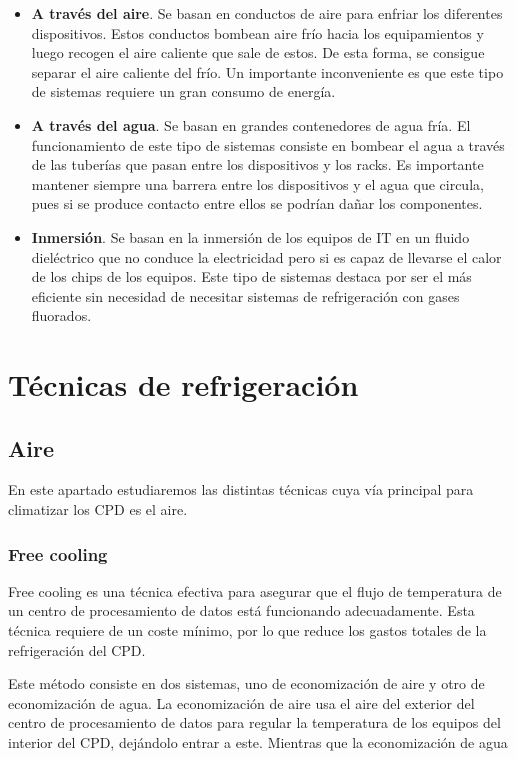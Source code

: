 \begin{itemize}
    \item \textbf{A través del aire}. Se basan en conductos de aire para enfriar los diferentes dispositivos. Estos conductos bombean aire frío hacia los equipamientos y luego recogen el aire caliente que sale de estos. De esta forma, se consigue separar el aire caliente del frío. Un importante inconveniente es que este tipo de sistemas requiere un gran consumo de energía.
    \item \textbf{A través del agua}. Se basan en grandes contenedores de agua fría. El funcionamiento de este tipo de sistemas consiste en bombear el agua a través de las tuberías que pasan entre los dispositivos y los racks. Es importante mantener siempre una barrera entre los dispositivos y el agua que circula, pues si se produce contacto entre ellos se podrían dañar los componentes.
    \item \textbf{Inmersión}. Se basan en la inmersión de los equipos de IT en un fluido dieléctrico que no conduce la electricidad pero si es capaz de llevarse el calor de los chips de los equipos. Este tipo de sistemas destaca por ser el más eficiente sin necesidad de necesitar sistemas de refrigeración con gases fluorados.
\end{itemize}

\section{Técnicas de refrigeración}

\subsection{Aire}

En este apartado estudiaremos las distintas técnicas cuya vía principal para climatizar los CPD es el aire.

\subsubsection{Free cooling}

Free cooling es una técnica efectiva para asegurar que el flujo de temperatura de un centro de procesamiento de datos está funcionando adecuadamente. Esta técnica requiere de un coste mínimo, por lo que reduce los gastos totales de la refrigeración del CPD.

Este método consiste en dos sistemas, uno de economización de aire y otro de economización de agua. La economización de aire usa el aire del exterior del centro de procesamiento de datos para regular la temperatura de los equipos del interior del CPD, dejándolo entrar a este. Mientras que la economización de agua %

